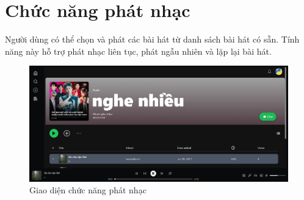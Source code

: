\section{Chức năng phát nhạc}
Người dùng có thể chọn và phát các bài hát từ danh sách bài hát có sẵn. Tính năng này hỗ trợ phát nhạc liên tục, phát ngẫu nhiên và lặp lại bài hát.

\begin{figure}[H]
    \centering
    \includegraphics[width=1\textwidth]{imgs/chap5/phat_nhac_1.png}
    \caption{Giao diện chức năng phát nhạc}
\end{figure}
